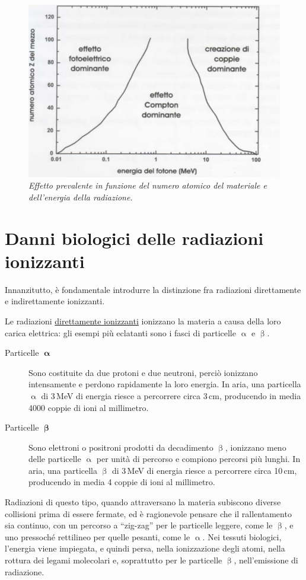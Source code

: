 \documentclass{report}
\newcommand{\virgolette}[1]{``#1''}
\numberwithin{equation}{section}
\numberwithin{figure}{section}
\begin{document}
\begin{figure}[htp]
\centering
\includegraphics[scale=0.85]{immagini/effetti.png}
\caption{\label{fig:effetti} \textit{Effetto prevalente in funzione del numero atomico del materiale e dell'energia della radiazione}.}
\end{figure}

\section{Danni biologici delle radiazioni ionizzanti}
Innanzitutto, è fondamentale introdurre la distinzione fra radiazioni direttamente e indirettamente ionizzanti.

Le radiazioni \underline{direttamente ionizzanti} ionizzano la materia a causa della loro carica elettrica: gli esempi più eclatanti sono i fasci di particelle $\upalpha$ e $\upbeta$.
\begin{description}
    \item[Particelle $\bm{\upalpha}$] Sono costituite da due protoni e due neutroni, perciò ionizzano intensamente e perdono rapidamente la loro energia. In aria, una particella $\upalpha$ di 3\,MeV di energia riesce a percorrere circa 3\,cm, producendo in media 4000 coppie di ioni al millimetro.
    \item[Particelle $\bm{\upbeta}$] Sono elettroni o positroni prodotti da decadimento $\upbeta$, ionizzano meno delle particelle $\upalpha$ per unità di percorso e compiono percorsi più lunghi. In aria, una particella $\upbeta$ di 3\,MeV di energia riesce a percorrere circa 10\,cm, producendo in media 4 coppie di ioni al millimetro.
\end{description}
Radiazioni di questo tipo, quando attraversano la materia subiscono diverse collisioni prima di essere fermate, ed è ragionevole pensare che il rallentamento sia continuo, con un percorso a \virgolette{zig-zag} per le particelle leggere, come le $\upbeta$, e uno pressoché rettilineo per quelle pesanti, come le $\upalpha$. Nei tessuti biologici, l'energia viene impiegata, e quindi persa, nella ionizzazione degli atomi, nella rottura dei legami molecolari e, soprattutto per le particelle $\upbeta$, nell'emissione di radiazione.
\end{document}
